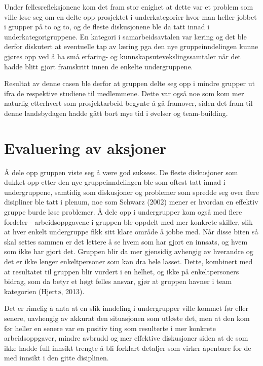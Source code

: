 Under fellesrefleksjonene kom det fram stor enighet at dette var et problem som ville løse seg om en delte opp prosjektet i underkategorier hvor man heller jobbet i grupper på to og to, og de fleste diskusjonene ble da tatt innad i underkategorigruppene. En kategori i samarbeidsavtalen var læring og det ble derfor diskutert at eventuelle tap av læring pga den nye gruppeinndelingen kunne gjøres opp ved å ha små erfaring- og kunnskapsutevekslingssamtaler når det hadde blitt gjort framskritt innen de enkelte undergruppene.

Resultat av denne casen ble derfor at gruppen delte seg opp i mindre grupper ut ifra de respektive studiene til medlemmene. Dette var også noe som kom mer naturlig etterhvert som prosjektarbeid begynte å gå framover, siden det fram til denne landsbydagen hadde gått bort mye tid i øvelser og team-building.

\section{Evaluering av aksjoner}
Å dele opp gruppen viste seg å være god suksess. De fleste diskusjoner som dukket opp etter den nye gruppeinndelingen ble som oftest tatt innad i undergruppene, samtidig som diskusjoner og problemer som spredde seg over flere disipliner ble tatt i plenum, noe som Schwarz (2002) mener er hvordan en effektiv gruppe burde løse problemer. Å dele opp i undergrupper kom også med flere fordeler - arbeidsoppgavene i gruppen ble oppdelt med mer konkrete skiller, slik at hver enkelt undergruppe fikk sitt klare område å jobbe med. Når disse biten så skal settes sammen er det lettere å se hvem som har gjort en innsats, og hvem som ikke har gjort det. Gruppen blir da mer gjensidig avhengig av hverandre og det er ikke lenger enkeltpersoner som kan dra hele lasset. Dette, kombinert med at resultatet til gruppen blir vurdert i en helhet, og ikke på enkeltpersoners bidrag, som da betyr et høgt felles ansvar, gjør at gruppen havner i team kategorien (Hjertø, 2013).

Det er rimelig å anta at en slik inndeling i undergrupper ville kommet før eller senere, uavhengig av akkurat den situasjonen som utløste det, men at den kom før heller en senere var en positiv ting som resulterte i mer konkrete arbeidsoppgaver, mindre avbrudd og mer effektive diskusjoner siden at de som ikke hadde full innsikt trengte å bli forklart detaljer som virker åpenbare for de med innsikt i den gitte disiplinen.
